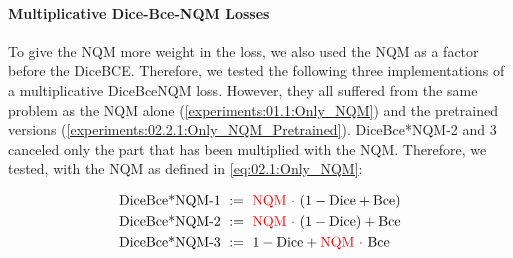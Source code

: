 \paragraph{Multiplicative Dice-Bce-NQM Losses}
\label{experiments:02.2.2:dice+NQM}
To give the NQM more weight in the loss, we also used the NQM as a factor before the DiceBCE. Therefore, we tested the following three implementations of a multiplicative DiceBceNQM loss. However, they all suffered from the same problem as the NQM alone (\autoref{experiments:01.1:Only_NQM}) and the pretrained versions (\autoref{experiments:02.2.1:Only_NQM_Pretrained}). DiceBce*NQM-2 and 3 canceled only the part that has been multiplied with the NQM. Therefore, we tested, with the NQM as defined in \autoref{eq:02.1:Only_NQM}:

\begin{align}
    \text{DiceBce*NQM-1}\ &:=\ {\color{red}\mathrm{NQM}\ \cdot\ }(1 - \mathrm{Dice} + \mathrm{Bce})\\
    \text{DiceBce*NQM-2}\ &:=\ {\color{red}\mathrm{NQM}\ \cdot\ }(1 - \mathrm{Dice}) + \mathrm{Bce}\\
    \text{DiceBce*NQM-3}\ &:=\ 1 - \mathrm{Dice} + {\color{red}\mathrm{NQM}\ \cdot\ }\mathrm{Bce}\\ 
\end{align}